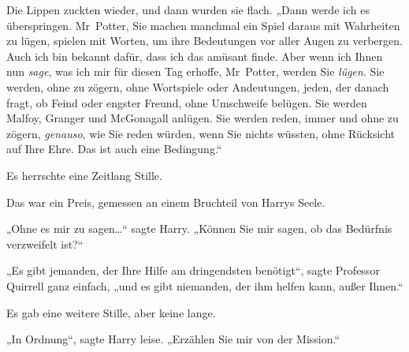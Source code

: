Die Lippen zuckten wieder, und dann wurden sie flach.
„Dann werde ich es überspringen. Mr~Potter, Sie machen manchmal ein Spiel daraus mit Wahrheiten zu lügen, spielen mit Worten, um ihre Bedeutungen vor aller Augen zu verbergen. Auch ich bin bekannt dafür, dass ich das amüsant finde. Aber wenn ich Ihnen nun \emph{sage}, was ich mir für diesen Tag erhoffe, Mr~Potter, werden Sie \emph{lügen}. Sie werden, ohne zu zögern, ohne Wortspiele oder Andeutungen, jeden, der danach fragt, ob Feind oder engster Freund, ohne Umschweife belügen. Sie werden Malfoy, Granger und McGonagall anlügen. Sie werden reden, immer und ohne zu zögern, \emph{genauso}, wie Sie reden würden, wenn Sie nichts wüssten, ohne Rücksicht auf Ihre Ehre. Das ist auch eine Bedingung.“

Es herrschte eine Zeitlang Stille.

Das war ein Preis, gemessen an einem Bruchteil von Harrys Seele.

„Ohne es mir zu sagen…“ sagte Harry.
„Können Sie mir sagen, ob das Bedürfnis verzweifelt ist?“

„Es gibt jemanden, der Ihre Hilfe am dringendsten benötigt“, sagte Professor Quirrell ganz einfach, „und es gibt niemanden, der ihm helfen kann, außer Ihnen.“

Es gab eine weitere Stille, aber keine lange.

„In Ordnung“, sagte Harry leise.
„Erzählen Sie mir von der Mission.“

